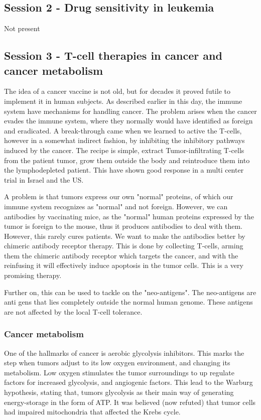 \documentclass[12p]{article}
\begin{document}
\subsection*{Session 2 - Drug sensitivity in leukemia}

Not present

\subsection*{Session 3 - T-cell therapies in cancer and cancer metabolism}

The idea of a cancer vaccine is not old, but for decades it proved futile to implement it in human subjects.
As described earlier in this day, the immune system have mechanisms for handling cancer.
The problem arises when the cancer evades the immune system, where they normally would have identified as foreign and eradicated.
A break-through came when we learned to active the T-cells, however in a somewhat indirect fashion, by inhibiting the inhibitory pathways induced by the cancer.
The recipe is simple, extract Tumor-infiltrating T-cells from the patient tumor, grow them outside the body and reintroduce them into the lymphodepleted patient.
This have shown good response in a multi center trial in Israel and the US.

A problem is that tumors express our own "normal" proteins, of which our immune system recognizes as "normal" and not foreign.
However, we can antibodies by vaccinating mice, as the "normal" human proteins expressed by the tumor is foreign to the mouse, thus it produces antibodies to deal with them.
However, this rarely cures patients.
We want to make the antibodies better by chimeric antibody receptor therapy.
This is done by collecting T-cells, arming them the chimeric antibody receptor which targets the cancer, and with the reinfusing it will effectively induce apoptosis in the tumor cells.
This is a very promising therapy.

Further on, this can be used to tackle on the "neo-antigens".
The neo-antigens are anti gens that lies completely outside the normal human genome.
These antigens are not affected by the local T-cell tolerance.

\subsubsection*{Cancer metabolism}

One of the hallmarks of cancer is aerobic glycolysis inhibitors.
This marks the step when tumors adjust to its low oxygen environment, and changing its metabolism.
Low oxygen stimulates the tumor surroundings to up regulate factors for increased glycolysis, and angiogenic factors.
This lead to the Warburg hypothesis, stating that, tumors glycolysis as their main way of generating energy-storage in the form of ATP.
It was believed (now refuted) that tumor cells had impaired mitochondria that affected the Krebs cycle.
\end{document}
